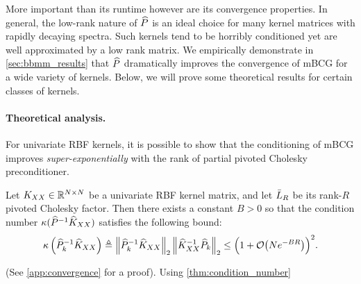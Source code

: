 More important than its runtime however are its convergence properties.
In general, the low-rank nature of $\widehat{P}$ is an ideal choice for many kernel matrices with rapidly decaying spectra.
Such kernels tend to be horribly conditioned yet are well approximated by a low rank matrix.
We empirically demonstrate in \cref{sec:bbmm_results} that $\widehat{P}$ dramatically improves the convergence of mBCG for a wide variety of kernels.
Below, we will prove some theoretical results for certain classes of kernels.


\paragraph{Theoretical analysis.}
For univariate RBF kernels, it is possible to show that the conditioning of mBCG improves \emph{super-exponentially} with the rank of partial pivoted Cholesky preconditioner.
%
\begin{lemma}
  \label{thm:condition_number}
  Let $K_{XX} \in \mathbb{R}^{N \times N}$ be a univariate RBF kernel matrix, and let $\bar{L}_{R}$ be its rank-$R$ pivoted Cholesky factor.
  Then there exists a constant $B > 0$ so that the condition number $\kappa(\widehat{P}^{-1}\widehat{K}_{XX})$ satisfies the following bound:
  \begin{equation}
    \kappa \left( \trainP_{k}^{-1}\trainK \right)
    \triangleq \left\Vert \trainP_{k}^{-1}\trainK \right\Vert_{2} \left\Vert \trainK^{-1}\trainP_{k} \right\Vert_{2}
    \leq \Bigl( 1 + \bigo{N e^{-BR}} \Bigr)^2.
  \end{equation}
\end{lemma}
%
\noindent
(See \cref{app:convergence} for a proof).
Using \cref{thm:condition_number}

